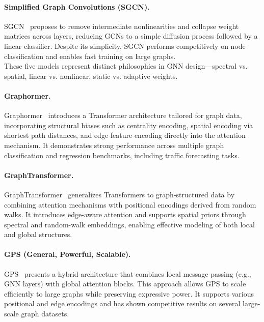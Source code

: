 \documentclass[runningheads]{llncs}
\begin{document}
\paragraph{Simplified Graph Convolutions (SGCN).}
SGCN~\cite{wu2019simplifying} proposes to remove intermediate nonlinearities and collapse weight matrices across layers, reducing GCNs to a simple diffusion process followed by a linear classifier. Despite its simplicity, SGCN performs competitively on node classification and enables fast training on large graphs.\\

These five models represent distinct philosophies in GNN design—spectral vs. spatial, linear vs. nonlinear, static vs. adaptive weights.

\paragraph{Graphormer.}
Graphormer~\cite{ying2021graphormer} introduces a Transformer architecture tailored for graph data, incorporating structural biases such as centrality encoding, spatial encoding via shortest path distances, and edge feature encoding directly into the attention mechanism. It demonstrates strong performance across multiple graph classification and regression benchmarks, including traffic forecasting tasks.

\paragraph{GraphTransformer.}
GraphTransformer~\cite{dwivedi2021generalization} generalizes Transformers to graph-structured data by combining attention mechanisms with positional encodings derived from random walks. It introduces edge-aware attention and supports spatial priors through spectral and random-walk embeddings, enabling effective modeling of both local and global structures.

\paragraph{GPS (General, Powerful, Scalable).}
GPS~\cite{rampasek2022gps} presents a hybrid architecture that combines local message passing (e.g., GNN layers) with global attention blocks. This approach allows GPS to scale efficiently to large graphs while preserving expressive power. It supports various positional and edge encodings and has shown competitive results on several large-scale graph datasets.\\
\end{document}
